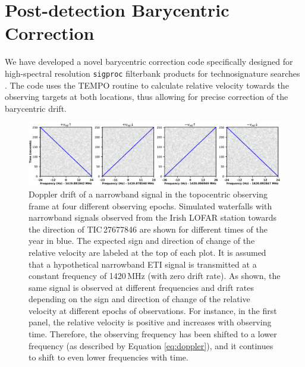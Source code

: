 

\section{Post-detection Barycentric Correction} \label{appen:barycenter}
We have developed a novel barycentric correction code specifically designed for high-spectral resolution \texttt{sigproc} filterbank products for technosignature searches \citep{Vishal_Bary}. The code uses the TEMPO routine to calculate relative velocity towards the observing targets at both locations, thus allowing for precise correction of the barycentric drift.

\begin{figure}[h]
    \centering
    \includegraphics[scale=0.45]{SETI/figures/Barycentric_frequency_drift.pdf}
    \caption{Doppler drift of a narrowband signal in the topocentric observing frame at four different observing epochs. Simulated waterfalls with narrowband signals observed from the Irish LOFAR station towards the direction of TIC\,27677846 are shown for different times of the year in blue. The expected sign and direction of change of the relative velocity are labeled at the top of each plot. It is assumed that a hypothetical narrowband ETI signal is transmitted at a constant frequency of 1420\,MHz (with zero drift rate). As shown, the same signal is observed at different frequencies and drift rates depending on the sign and direction of change of the relative velocity at different epochs of observations. For instance, in the first panel, the relative velocity is positive and increases with observing time. Therefore, the observing frequency has been shifted to a lower frequency (as described by Equation \ref{eq:doppler}), and it continues to shift to even lower frequencies with time.}
    \label{fig:bary_simulated_drift}
\end{figure}
 
